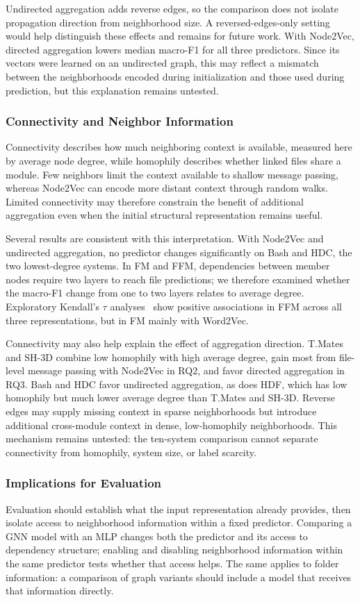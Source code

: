 Undirected aggregation adds reverse edges, so the comparison does not isolate propagation direction from neighborhood size. A reversed-edges-only setting would help distinguish these effects and remains for future work. With Node2Vec, directed aggregation lowers median macro-F1 for all three predictors. Since its vectors were learned on an undirected graph, this may reflect a mismatch between the neighborhoods encoded during initialization and those used during prediction, but this explanation remains untested.

\subsubsection*{Connectivity and Neighbor Information}
Connectivity describes how much neighboring context is available, measured here by average node degree, while homophily describes whether linked files share a module. Few neighbors limit the context available to shallow message passing, whereas Node2Vec can encode more distant context through random walks. Limited connectivity may therefore constrain the benefit of additional aggregation even when the initial structural representation remains useful.

Several results are consistent with this interpretation. With Node2Vec and undirected aggregation, no predictor changes significantly on Bash and HDC, the two lowest-degree systems. In FM and FFM, dependencies between member nodes require two layers to reach file predictions; we therefore examined whether the macro-F1 change from one to two layers relates to average degree. Exploratory Kendall’s $\tau$ analyses~\cite{kendall} show positive associations in FFM across all three representations, but in FM mainly with Word2Vec.

Connectivity may also help explain the effect of aggregation direction. T.Mates and SH-3D combine low homophily with high average degree, gain most from file-level message passing with Node2Vec in RQ2, and favor directed aggregation in RQ3. Bash and HDC favor undirected aggregation, as does HDF, which has low homophily but much lower average degree than T.Mates and SH-3D. Reverse edges may supply missing context in sparse neighborhoods but introduce additional cross-module context in dense, low-homophily neighborhoods. This mechanism remains untested: the ten-system comparison cannot separate connectivity from homophily, system size, or label scarcity.

\subsubsection*{Implications for Evaluation}
Evaluation should establish what the input representation already provides, then isolate access to neighborhood information within a fixed predictor. Comparing a GNN model with an MLP changes both the predictor and its access to dependency structure; enabling and disabling neighborhood information within the same predictor tests whether that access helps. The same applies to folder information: a comparison of graph variants should include a model that receives that information directly.

